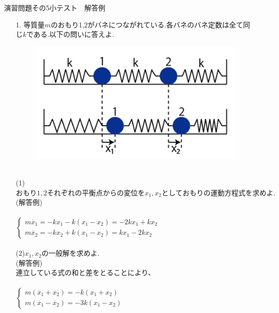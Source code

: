 \documentclass[11pt]{jarticle}
\begin{document}
\newpage
\begin{center}
{\Large
演習問題その5小テスト　解答例}\\
\end{center}
\begin{enumerate}
\item[1.]
等質量$m$のおもり1,2がバネにつながれている.各バネのバネ定数は全て同じ$k$である.以下の問いに答えよ.\\
\begin{figure}[htpb]
\begin{center}
\includegraphics[scale=.20]{bane.png}
\end{center}
\end{figure}
\\
(1)$おもり1,2それぞれの平衡点からの変位をx_1,x_2としておもりの運動方程式を求めよ.$\\
(解答例)\\
\\
$\left\{ \begin{array}{l}
m\ddot{x_1}=-kx_1-k(x_1-x_2)=-2kx_1+kx_2 \\
m\ddot{x_2}=-kx_2+k(x_1-x_2)=kx_1-2kx_2
\end{array} \right.$\\
\\
(2)$x_1,x_2の一般解を求めよ.$\\
(解答例)\\
連立している式の和と差をとることにより、\\
\\
$\left\{ \begin{array}{l}
m(\ddot{x_1}+\ddot{x_2})=-k(x_1+x_2) \\
m(\ddot{x_1}-\ddot{x_2})=-3k(x_1-x_2)
\end{array} \right.$\\

\end{enumerate}
\end{document}
